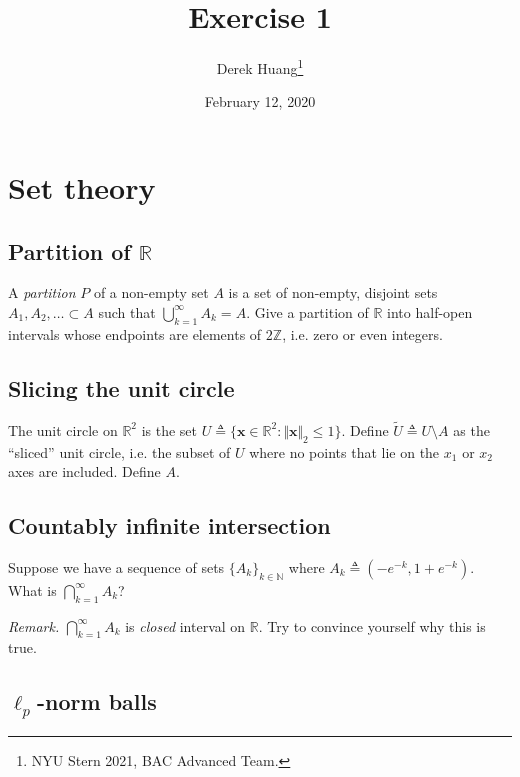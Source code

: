 \documentclass{article}
\title{Exercise 1}
\author{Derek Huang\thanks{NYU Stern 2021, BAC Advanced Team.}}
\date{February 12, 2020}
\numberwithin{equation}{section}
\begin{document}
\maketitle
\thispagestyle{fancy}

\section{Set theory}

\subsection{Partition of $ \mathbb{R} $}

A \textit{partition} $ P $ of a non-empty set $ A $ is a set of non-empty,
disjoint sets $ A_1, A_2, \ldots \subset A $ such that
$ \bigcup_{k = 1}^\infty A_k = A $. Give a partition of $ \mathbb{R} $ into
half-open intervals whose endpoints are elements of $ 2\mathbb{Z} $, i.e. zero
or even integers.

\subsection{Slicing the unit circle}

The unit circle on $ \mathbb{R}^2 $ is the set
$ U \triangleq \{\mathbf{x} \in \mathbb{R}^2 :
\Vert\mathbf{x}\Vert_2 \le 1\} $. Define
$ \tilde{U} \triangleq U \setminus A $ as the ``sliced'' unit circle, i.e. the
subset of $ U $ where no points that lie on the $ x_1 $ or $ x_2 $ axes are
included. Define $ A $.

\subsection{Countably infinite intersection}

Suppose we have a sequence of sets $ \{A_k\}_{k \in \mathbb{N}} $ where
$ A_k \triangleq \left(-e^{-k}, 1 + e^{-k}\right) $. What is
$ \bigcap_{k = 1}^\infty A_k $?

\medskip

\textit{Remark.} $ \bigcap_{k = 1}^\infty A_k $ is \textit{closed} interval
on $ \mathbb{R} $. Try to convince yourself why this is true.

\subsection{$ \ell_p $-norm balls}
\end{document}
